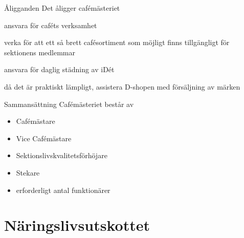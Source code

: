 \documentclass[pdfbookmarks,a4paper,11pt]{article}
\newlength{\itemcollength}
\newenvironment{reglemlista}{%
  \begin{list}{}{%
      \setlength{\labelwidth}{\itemcollength}%
      \setlength{\leftmargin}{\labelwidth + \labelsep}%
      \renewcommand{\makelabel}[1]{%
        \raisebox{0pt}[1ex][0pt]{%
          \makebox[\labelwidth][l]{%
            \parbox[t]{\itemcollength}{%
              \raggedright\hspace{0pt}##1}}}\hfill}%
      }}{%
  \end{list}}
\begin{document}
\begin{reglemlista}

	\item[Åligganden]
	Det åligger cafémästeriet
	\begin{attlista}
		\item ansvara för caféts verksamhet
		\item verka för att ett så brett cafésortiment som möjligt finns tillgängligt för sektionens medlemmar
		\item ansvara för daglig städning av iDét
		\item då det är praktiskt lämpligt, assistera D-shopen med försäljning av märken
	\end{attlista}

	\item[Sammansättning]
	Cafémästeriet består av
	\begin{itemize}
		\item Cafémästare
		\item Vice Cafémästare
		\item Sektionslivskvalitetsförhöjare
		\item Stekare
		\item erforderligt antal funktionärer
	\end{itemize}

\end{reglemlista}

\section{Näringslivsutskottet}
\end{document}
